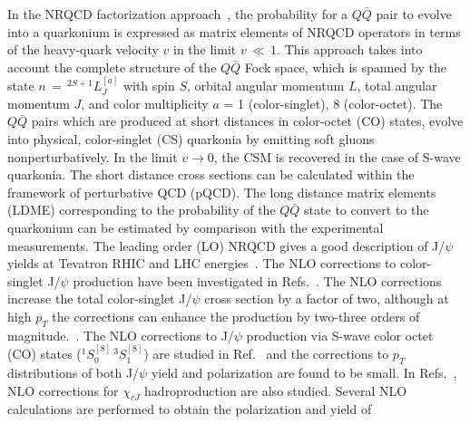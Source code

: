 \documentclass[12pt,a4paper,final]{iopart}
\newcommand{\barQ}{{\bar{Q}}}
\begin{document}
  In the NRQCD factorization approach~\cite{Bodwin:1994jh},
the probability for a $Q\bar Q$ pair to evolve into a quarkonium is expressed
as matrix elements of NRQCD operators in terms of the heavy-quark velocity 
$v$ in the limit $v\,\ll\,1$. This approach takes into account the complete structure of 
the $Q\bar Q$ Fock space, which is spanned by the state $n\,=\,^{2S+1}L_{J}^{[a]}$ 
with spin $S$, orbital angular momentum $L$, total angular momentum $J$, 
and color multiplicity $a$ = 1 (color-singlet), 8 (color-octet). 
 The $Q\bar Q$ pairs which are produced at short distances in color-octet (CO) states, 
evolve into physical, color-singlet (CS) quarkonia by emitting soft gluons 
nonperturbatively.
 In the limit $v\rightarrow0$, the CSM is recovered in the case of S-wave quarkonia.
 The short distance cross sections can be calculated within the 
framework of perturbative QCD (pQCD). The long distance matrix elements (LDME) 
corresponding to the probability of the $Q\barQ$ state to convert to the quarkonium 
can be estimated by comparison with the experimental measurements. 
  The leading order (LO) NRQCD gives a good description of J/$\psi$ yields at 
Tevatron RHIC and LHC energies~\cite{Beneke:1996yw,Braaten:1999qk,Sharma:2012dy}.
  The NLO corrections to color-singlet J/$\psi$ production have been investigated 
in Refs.~\cite{Campbell:2007ws,Gong:2008sn}.
{\color{black}
 The NLO corrections increase the total color-singlet J/$\psi$ cross section by a 
 factor of two, although at high $p_T$ the corrections can enhance the production by
 two-three orders of magnitude.~\cite{Gong:2008sn}.
 The NLO corrections to J/$\psi$ production via S-wave 
 color octet (CO) states ($^1S_{0}^{[8]}\,^3S_{1}^{[8]}$) are studied in 
 Ref.~\cite{Gong:2008ft} and the corrections to $p_{T}$ distributions of both 
 J/$\psi$ yield and polarization are found to be small.
}
In Refs.~\cite{Ma:2010vd}, 
NLO corrections for $\chi_{cJ}$ hadroproduction are also studied. 
Several NLO calculations are performed to obtain the polarization and yield of
\end{document}
